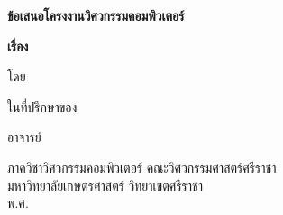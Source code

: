 \begin{center}
{\fontsize{30pt}{32pt}\selectfont\bfseries ข้อเสนอโครงงานวิศวกรรมคอมพิวเตอร์}

{\bfseries
เรื่อง


\vfill
โดย


\vfill
ในที่ปรึกษาของ

อาจารย์%

ภาควิชาวิศวกรรมคอมพิวเตอร์ คณะวิศวกรรมศาสตร์ศรีราชา\\
มหาวิทยาลัยเกษตรศาสตร์ วิทยาเขตศรีราชา\\
พ.ศ. \thisYear
}
\end{center}
